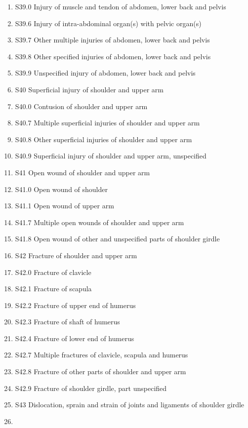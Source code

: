 \documentclass[
]{scrartcl}
\begin{document}
\begin{itemize}
\begin{enumerate}
  \item
    S39.0 Injury of muscle and tendon of abdomen, lower back and pelvis
  \item
    S39.6 Injury of intra-abdominal organ(s) with pelvic organ(s)
  \item
    S39.7 Other multiple injuries of abdomen, lower back and pelvis
  \item
    S39.8 Other specified injuries of abdomen, lower back and pelvis
  \item
    S39.9 Unspecified injury of abdomen, lower back and pelvis
  \item
    S40 Superficial injury of shoulder and upper arm
  \item
    S40.0 Contusion of shoulder and upper arm
  \item
    S40.7 Multiple superficial injuries of shoulder and upper arm
  \item
    S40.8 Other superficial injuries of shoulder and upper arm
  \item
    S40.9 Superficial injury of shoulder and upper arm, unspecified
  \item
    S41 Open wound of shoulder and upper arm
  \item
    S41.0 Open wound of shoulder
  \item
    S41.1 Open wound of upper arm
  \item
    S41.7 Multiple open wounds of shoulder and upper arm
  \item
    S41.8 Open wound of other and unspecified parts of shoulder girdle
  \item
    S42 Fracture of shoulder and upper arm
  \item
    S42.0 Fracture of clavicle
  \item
    S42.1 Fracture of scapula
  \item
    S42.2 Fracture of upper end of humerus
  \item
    S42.3 Fracture of shaft of humerus
  \item
    S42.4 Fracture of lower end of humerus
  \item
    S42.7 Multiple fractures of clavicle, scapula and humerus
  \item
    S42.8 Fracture of other parts of shoulder and upper arm
  \item
    S42.9 Fracture of shoulder girdle, part unspecified
  \item
    S43 Dislocation, sprain and strain of joints and ligaments of
    shoulder girdle
  \item

\end{enumerate}
\end{itemize}
\end{document}
